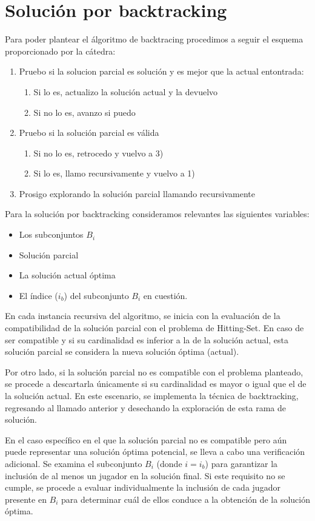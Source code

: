 \section{Solución por backtracking}

Para poder plantear el álgoritmo de backtracing procedimos a seguir el esquema proporcionado por la cátedra:
\begin{enumerate}
    \item Pruebo si la solucion parcial es solución y es mejor que la actual entontrada:
    \begin {enumerate}
        \item Si lo es, actualizo la solución actual y la devuelvo
        \item Si no lo es, avanzo si puedo
    \end{enumerate}
    \item Pruebo si la solución parcial es válida
    \begin {enumerate}
        \item Si no lo es, retrocedo y vuelvo a 3)
        \item Si lo es, llamo recursivamente y vuelvo a 1)
    \end{enumerate}
    \item Prosigo explorando la solución parcial llamando recursivamente
\end{enumerate}

Para la solución por backtracking consideramos relevantes las siguientes variables:
\begin{itemize}
    \item Los subconjuntos $B_i$
    \item Solución parcial
    \item La solución actual óptima 
    \item El índice ($i_b$) del subconjunto $B_i$ en cuestión. 
\end{itemize}

En cada instancia recursiva del algoritmo, se inicia con la evaluación de la compatibilidad de la solución parcial con el problema de Hitting-Set. En caso de ser compatible y si su cardinalidad es inferior a la de la solución actual, esta solución parcial se considera la nueva solución óptima (actual).

Por otro lado, si la solución parcial no es compatible con el problema planteado, se procede a descartarla únicamente si su cardinalidad es mayor o igual que el de la solución actual. En este escenario, se implementa la técnica de backtracking, regresando al llamado anterior y desechando la exploración de esta rama de solución.

En el caso específico en el que la solución parcial no es compatible pero aún puede representar una solución óptima potencial, se lleva a cabo una verificación adicional. Se examina el subconjunto $B_i$ (donde $i=i_b$) para garantizar la inclusión de al menos un jugador en la solución final. Si este requisito no se cumple, se procede a evaluar individualmente la inclusión de cada jugador presente en $B_i$ para determinar cuál de ellos conduce a la obtención de la solución óptima.


